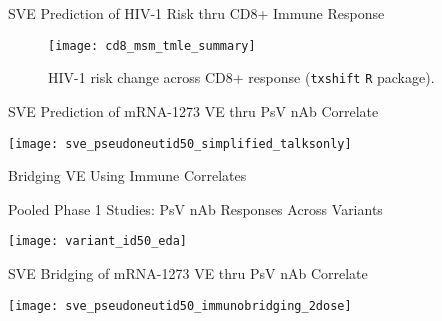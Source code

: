 \documentclass{beamer}
\begin{document}

\begin{frame}[c]{SVE Prediction of HIV-1 Risk thru CD8+ Immune Response}

\vspace{-0.3in}
\begin{figure}[H]
  \centering
  \texttt{[image: cd8\_msm\_tmle\_summary]}
  \captionsetup{labelformat=empty}
  \vspace{-1.5em}
  \caption{
    HIV-1 risk change across CD8+ response (\texttt{txshift} \texttt{R}
    package).
  }
\end{figure}

\note{
}

\end{frame}


\begin{frame}[c]{SVE Prediction of mRNA-1273 VE thru PsV nAb Correlate}

\vspace*{-0.1cm}
\hspace*{-0.3cm}\texttt{[image: sve\_pseudoneutid50\_simplified\_talksonly]}

\note{
}

\end{frame}


\begin{frame}[standout]
  Bridging VE Using Immune Correlates
\end{frame}


\begin{frame}[c]{Pooled Phase 1 Studies: PsV nAb Responses Across Variants}

\vspace*{0.15cm}
\hspace*{-0.8cm}\texttt{[image: variant\_id50\_eda]}

\note{
}

\end{frame}


\begin{frame}[c]{SVE Bridging of mRNA-1273 VE thru PsV nAb Correlate}

\vspace*{-0.1cm}
\hspace*{-0.3cm}\texttt{[image: sve\_pseudoneutid50\_immunobridging\_2dose]}


\end{frame}
\end{document}

